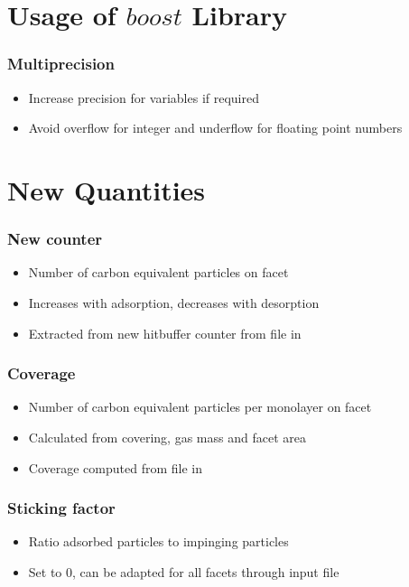 \section{Usage of $boost$ Library}
\subsubsection{Multiprecision}
\begin{itemize}[noitemsep,topsep=0pt, partopsep=0pt]
\item Increase precision for variables if required
\item Avoid overflow for integer and underflow for floating point numbers
\end{itemize}
\section{New Quantities}
\label{sub:quant}
\subsubsection{New counter }
\begin{itemize}[noitemsep,topsep=0pt, partopsep=0pt]
\item Number of carbon equivalent particles on facet
\item Increases with adsorption, decreases with desorption
\item Extracted from new hitbuffer counter from  file in 
\end{itemize}

\subsubsection{Coverage}
\begin{itemize}[noitemsep,topsep=0pt, partopsep=0pt]
\item Number of carbon equivalent particles per monolayer on facet
\item Calculated from covering, gas mass and facet area
\item Coverage computed from  file in 
\end{itemize}

\subsubsection{Sticking factor}
\begin{itemize}[noitemsep,topsep=0pt, partopsep=0pt]
\item Ratio adsorbed particles to impinging particles
\item Set to 0, can be adapted for all facets through input file
\end{itemize}


